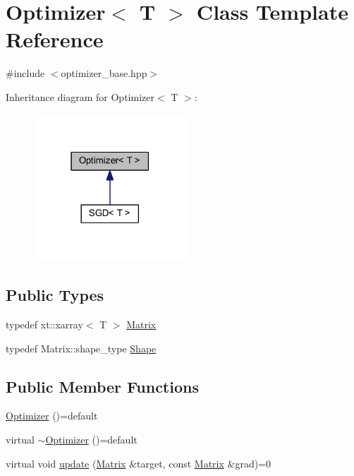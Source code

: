 \hypertarget{class_optimizer}{}\section{Optimizer$<$ T $>$ Class Template Reference}
\label{class_optimizer}


{\ttfamily \#include $<$optimizer\+\_\+base.\+hpp$>$}



Inheritance diagram for Optimizer$<$ T $>$\+:
\nopagebreak
\begin{figure}[H]
\begin{center}
\leavevmode
\includegraphics[width=162pt]{class_optimizer__inherit__graph}
\end{center}
\end{figure}
\subsection*{Public Types}
\begin{DoxyCompactItemize}
\item 
typedef xt\+::xarray$<$ T $>$ \mbox{\hyperlink{class_optimizer_a1fa5c63152a16b8ff94df2d66e3a7a97}{Matrix}}
\item 
typedef Matrix\+::shape\+\_\+type \mbox{\hyperlink{class_optimizer_a95929960c606690f519e24f3ed8e1ab9}{Shape}}
\end{DoxyCompactItemize}
\subsection*{Public Member Functions}
\begin{DoxyCompactItemize}
\item 
\mbox{\hyperlink{class_optimizer_aaea376789a8baff0af7d215818b61bf6}{Optimizer}} ()=default
\item 
virtual \mbox{\hyperlink{class_optimizer_a1608fe90b2559c048f7d7e94ba4cf2f2}{$\sim$\+Optimizer}} ()=default
\item 
virtual void \mbox{\hyperlink{class_optimizer_a3f4859896cf9edab31b3875af7aad0cd}{update}} (\mbox{\hyperlink{class_optimizer_a1fa5c63152a16b8ff94df2d66e3a7a97}{Matrix}} \&target, const \mbox{\hyperlink{class_optimizer_a1fa5c63152a16b8ff94df2d66e3a7a97}{Matrix}} \&grad)=0
\end{DoxyCompactItemize}
